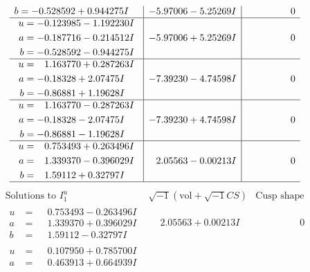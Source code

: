 \documentclass[1p]{elsarticle_modified}
\theoremstyle{definition}
\newcommand{\I}{\sqrt{-1}}
\begin{document}
$$\begin{array}{c|c|c}
\begin{aligned}
b &= -0.528592 + 0.944275 I\end{aligned}
 & -5.97006 - 5.25269 I & \phantom{-0.000000 } 0 \\ \hline\begin{aligned}
u &= -0.123985 - 1.192230 I \\
a &= -0.187716 - 0.214512 I \\
b &= -0.528592 - 0.944275 I\end{aligned}
 & -5.97006 + 5.25269 I & \phantom{-0.000000 } 0 \\ \hline\begin{aligned}
u &= \phantom{-}1.163770 + 0.287263 I \\
a &= -0.18328 + 2.07475 I \\
b &= -0.86881 + 1.19628 I\end{aligned}
 & -7.39230 - 4.74598 I & \phantom{-0.000000 } 0 \\ \hline\begin{aligned}
u &= \phantom{-}1.163770 - 0.287263 I \\
a &= -0.18328 - 2.07475 I \\
b &= -0.86881 - 1.19628 I\end{aligned}
 & -7.39230 + 4.74598 I & \phantom{-0.000000 } 0 \\ \hline\begin{aligned}
u &= \phantom{-}0.753493 + 0.263496 I \\
a &= \phantom{-}1.339370 - 0.396029 I \\
b &= \phantom{-}1.59112 + 0.32797 I\end{aligned}
 & \phantom{-}2.05563 - 0.00213 I & \phantom{-0.000000 } 0\\
 \hline 
 \end{array}$$\newpage$$\begin{array}{c|c|c}  
\text{Solutions to }I^u_{1}& \I (\text{vol} + \sqrt{-1}CS) & \text{Cusp shape}\\
 \hline 
\begin{aligned}
u &= \phantom{-}0.753493 - 0.263496 I \\
a &= \phantom{-}1.339370 + 0.396029 I \\
b &= \phantom{-}1.59112 - 0.32797 I\end{aligned}
 & \phantom{-}2.05563 + 0.00213 I & \phantom{-0.000000 } 0 \\ \hline\begin{aligned}
u &= \phantom{-}0.107950 + 0.785700 I \\
a &= \phantom{-}0.463913 + 0.664939 I \\

\end{aligned}
\end{array}$$
\end{document}
